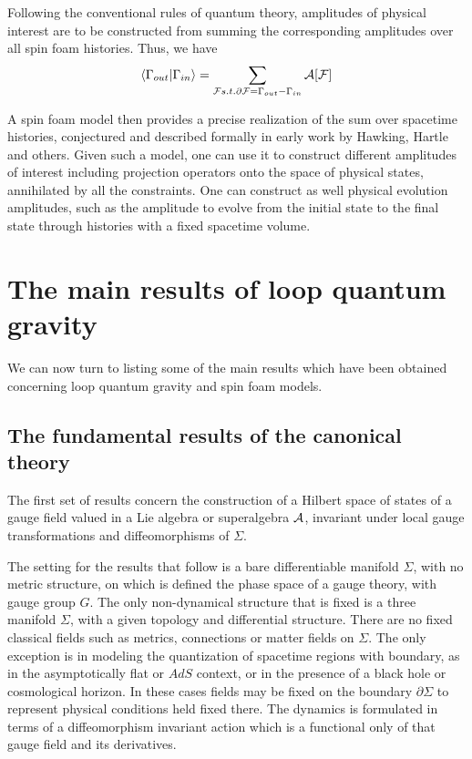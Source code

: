 \documentclass[12pt]{article}
\newcommand{\f}{\begin{equation}}
\newcommand{\ff}{\end{equation}}
\begin{document}
Following the conventional rules of quantum theory, amplitudes of physical interest
are to be constructed from summing the corresponding amplitudes over all 
spin foam histories.  Thus, we have
\f
\langle\Gamma_{out}|\Gamma_{in}\rangle = \sum_{{\cal F} s.t. \partial {\cal F} =\Gamma_{out}-\Gamma_{in} }
{\cal A}[{\cal F} ]
\ff

A spin foam model then provides a precise realization of the sum over spacetime
histories, conjectured and described formally in early work by Hawking, Hartle and
others.  Given such a model, one can use it to construct different amplitudes of
interest including projection operators onto the space of physical states, annihilated
by all the constraints. One can construct as well physical evolution amplitudes,
such as the amplitude to evolve from the initial state to the final state through
histories with a fixed spacetime volume.




\section{The main results of loop quantum gravity }

We can now turn to listing some of the main results which have been obtained
concerning loop quantum gravity and spin foam models. 



\subsection{The fundamental results of the canonical theory}

The first set of results concern the construction of a Hilbert space of states of a gauge field valued
in a Lie algebra or superalgebra  $\cal A$, 
invariant under local gauge transformations and diffeomorphisms of $\Sigma$. 

The setting for the results that follow is  a bare differentiable manifold 
$\Sigma$, with no metric structure, on which is defined the phase 
space of a gauge theory, with gauge group $G$. The only non-dynamical structure that is
fixed is a three manifold $\Sigma$, with a given topology and
differential structure. There are no fixed classical fields such as
metrics, connections or matter fields on $\Sigma$. The only exception 
is in modeling the quantization of spacetime regions with boundary,
as in the asymptotically flat or $AdS$ context, or in the presence of
a black hole or cosmological horizon. In these cases 
fields may be fixed on the boundary $\partial \Sigma$
to represent physical conditions held fixed there. 
The dynamics is formulated in terms of a 
diffeomorphism invariant action which is a functional only of that 
gauge field and its derivatives.  
\end{document}

